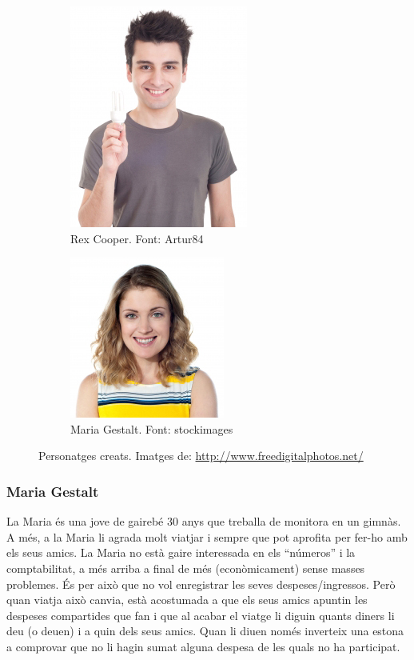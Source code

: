 \begin{figure}
	\centering
	\begin{subfigure}[b]{0.5\textwidth}
		\centering
		\includegraphics[scale=0.4]{Rex_cooper.jpg}
		\caption{Rex Cooper. Font: Artur84}
		\label{fig:rex_cooper}
	\end{subfigure}
	\quad
	\begin{subfigure}[b]{0.5\textwidth}
		\centering
		\includegraphics[scale=0.5]{Maria_gestalt.jpg}
		\caption{Maria Gestalt. Font: stockimages}
		\label{fig:maria_gestalt}
	\end{subfigure}

\caption{Personatges creats. Imatges de: \url{http://www.freedigitalphotos.net/}}\label{fig:personas}
\end{figure}


\subsubsection{Maria Gestalt}

La Maria és una jove de gairebé 30 anys que treballa de monitora en un gimnàs. A més, a la Maria li agrada molt viatjar i sempre que pot aprofita per fer-ho amb els seus amics.
La Maria no està gaire interessada en els “números” i la comptabilitat, a més arriba a final de més (econòmicament) sense masses problemes. És per això que no vol enregistrar les seves despeses/ingressos. Però quan viatja això canvia, està acostumada a que els seus amics apuntin les despeses compartides que fan i que al acabar el viatge li diguin quants diners li deu (o deuen) i a quin dels seus amics. Quan li diuen només inverteix una estona a comprovar que no li hagin sumat alguna despesa de les quals no ha participat. 

